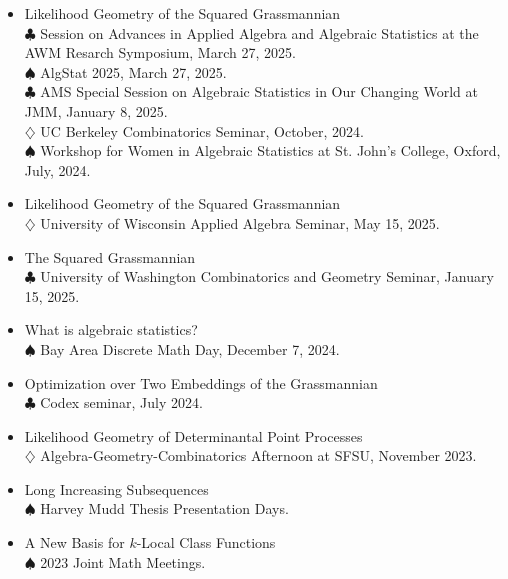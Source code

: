 \documentclass[11pt]{article}
\begin{document}
\begin{itemize}
  $\clubsuit$  Problem Solving Workshop: Computational Geometric Analysis, June 4, 2025.
\item Likelihood Geometry of the Squared Grassmannian\\
  $\clubsuit$ Session on Advances in Applied Algebra and Algebraic Statistics at the AWM Resarch Symposium, March 27, 2025.\\    
  $\spadesuit$ AlgStat 2025, March 27, 2025.\\  
  $\clubsuit$ AMS Special Session on Algebraic Statistics in Our Changing World at JMM, January 8, 2025.\\
  $\diamondsuit$ UC Berkeley Combinatorics Seminar, October, 2024.\\
  $\spadesuit$ Workshop for Women in Algebraic Statistics at St. John's College, Oxford, July, 2024.
\item Likelihood Geometry of the Squared Grassmannian\\
  $\diamondsuit$ University of Wisconsin Applied Algebra Seminar, May 15, 2025.
\item The Squared Grassmannian\\
  $\clubsuit$ University of Washington Combinatorics and Geometry Seminar, January 15, 2025.
\item What is algebraic statistics?\\
  $\spadesuit$ Bay Area Discrete Math Day, December 7, 2024. 
\item Optimization over Two Embeddings of the Grassmannian\\
  $\clubsuit$ Codex seminar, July 2024. 
\item Likelihood Geometry of Determinantal Point Processes\\
  $\diamondsuit$ Algebra-Geometry-Combinatorics Afternoon at SFSU, November 2023.
\item Long Increasing Subsequences\\
  $\spadesuit$ Harvey Mudd Thesis Presentation Days.
\item A New Basis for $k$-Local Class Functions\\
  $\spadesuit$ 2023 Joint Math Meetings.
\end{itemize}

\bigskip
\end{document}
